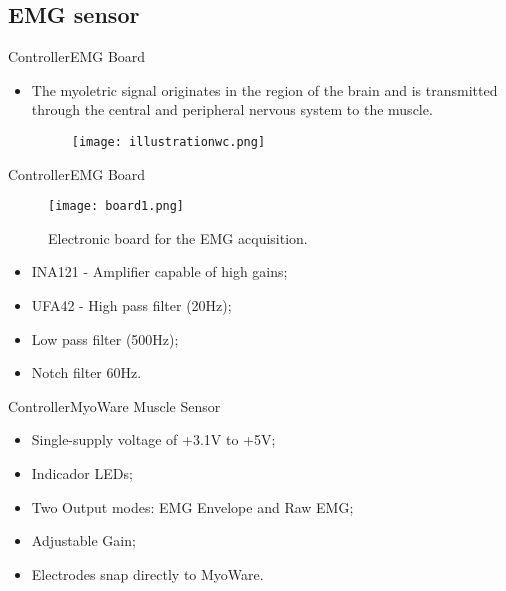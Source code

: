 \documentclass[10pt]{beamer}
\begin{document}
\subsection{EMG sensor}
\begin{frame}{Controller}{EMG Board}
  \begin{itemize}
  	\item The myoletric signal originates in the region of the brain and is transmitted through the central and peripheral nervous system to the muscle.
\begin{figure}
\centering
\texttt{[image: illustrationwc.png]}
\end{figure}
  \end{itemize}  
\end{frame}
\begin{frame}{Controller}{EMG Board}
	\begin{figure}
	\centering
	\texttt{[image: board1.png]}
	\caption{Electronic board for the EMG acquisition.}
	\end{figure}
	
	\begin{itemize}
		\item INA121 - Amplifier capable of high gains;
		\item UFA42 - High pass filter (20Hz);
		\item Low pass filter (500Hz);
		\item Notch filter 60Hz.
	\end{itemize}
\end{frame}
\begin{frame}{Controller}{MyoWare Muscle Sensor}
\begin{itemize}
	\item Single-supply voltage of +3.1V to +5V;
	\item Indicador LEDs;
	\item Two Output modes: EMG Envelope and Raw EMG;
	\item Adjustable Gain;
	\item Electrodes snap directly to MyoWare.
\end{itemize}
\end{frame}
\end{document}
